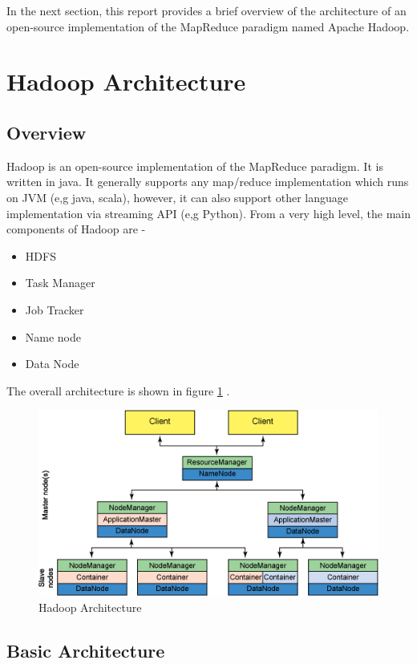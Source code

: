 \documentclass{article}
\begin{document}
In the next section, this report provides a brief overview of the architecture of an open-source implementation of the MapReduce paradigm named Apache Hadoop.

\section{Hadoop Architecture}
\subsection {Overview}
Hadoop is an open-source implementation of the MapReduce paradigm. It is written in java. It generally supports any map/reduce implementation which runs on JVM (e,g java, scala), however, it can also support other language implementation via streaming API (e,g Python). From a very high level, the main components of Hadoop are -
\begin{itemize}
\item HDFS
\item Task Manager
\item Job Tracker
\item Name node
\item Data Node
\end{itemize}

The overall architecture is shown in figure \ref{fig:hadoop-arch} \cite{hadoopibm}.

\begin{figure}[h]
	\centering
	\includegraphics[width=\textwidth]{hadoop-arch}
	\caption{Hadoop Architecture}
	\label{fig:hadoop-arch}
\end{figure}

\subsection {Basic Architecture}
\end{document}
